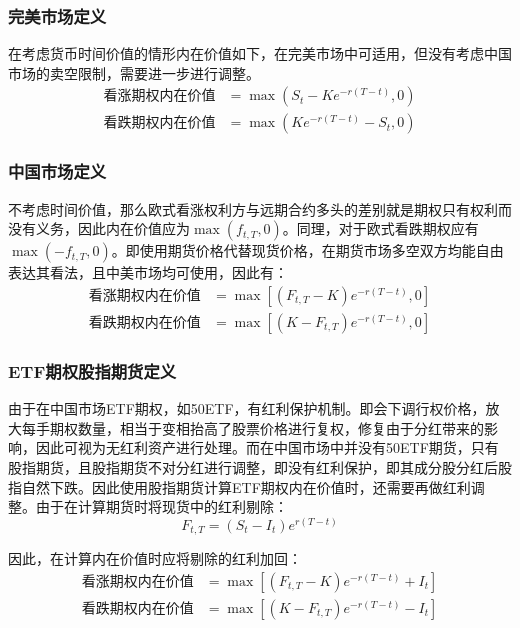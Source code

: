 \documentclass[11pt]{article}
\begin{document}
\subsubsection{完美市场定义}

在考虑货币时间价值的情形内在价值如下，在完美市场中可适用，但没有考虑中国市场的卖空限制，需要进一步进行调整。
\begin{align*}
    \text{看涨期权内在价值} & = \max\left(S_t-Ke^{-r(T-t)},0\right) \\
    \text{看跌期权内在价值} & = \max\left(Ke^{-r(T-t)}-S_t,0\right)
\end{align*}

\subsubsection{中国市场定义}

不考虑时间价值，那么欧式看涨权利方与远期合约多头的差别就是期权只有权利而没有义务，因此内在价值应为$\max(f_{t,T},0)$。同理，对于欧式看跌期权应有$\max(-f_{t,T},0)$。即使用期货价格代替现货价格，在期货市场多空双方均能自由表达其看法，且中美市场均可使用，因此有：
\begin{align*}
    \text{看涨期权内在价值} & = \max\left[(F_{t,T}-K)e^{-r(T-t)},0\right] \\
    \text{看跌期权内在价值} & = \max\left[(K-F_{t,T})e^{-r(T-t)},0\right]
\end{align*}

\subsubsection{ETF期权股指期货定义}

由于在中国市场ETF期权，如50ETF，有红利保护机制。即会下调行权价格，放大每手期权数量，相当于变相抬高了股票价格进行复权，修复由于分红带来的影响，因此可视为无红利资产进行处理。而在中国市场中并没有50ETF期货，只有股指期货，且股指期货不对分红进行调整，即没有红利保护，即其成分股分红后股指自然下跌。因此使用股指期货计算ETF期权内在价值时，还需要再做红利调整。由于在计算期货时将现货中的红利剔除：
\begin{equation*}
    F_{t,T} = ( S_t - I_t )e^{r(T-t)}
\end{equation*}

因此，在计算内在价值时应将剔除的红利加回：
\begin{align*}
    \text{看涨期权内在价值} & = \max\left[ (F_{t,T}-K) e^{-r(T-t)} + I_t \right] \\
    \text{看跌期权内在价值} & = \max\left[ (K-F_{t,T}) e^{-r(T-t)} - I_t \right]
\end{align*}
\end{document}
